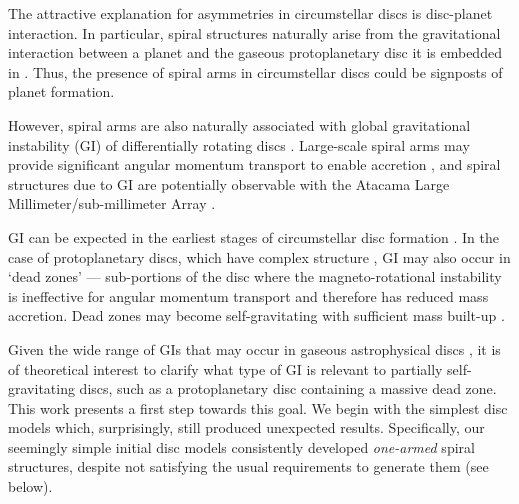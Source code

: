 \documentclass[useAMS,usenatbib]{mn2e}
\begin{document}
The attractive explanation for asymmetries in circumstellar discs is
disc-planet interaction. In particular, spiral structures  
naturally arise from the gravitational interaction between a
planet and the gaseous protoplanetary disc it is embedded in
\citep[see, e.g.][for a recent review]{baruteau13b}. Thus, the
presence of spiral arms in circumstellar discs could be signposts of 
planet formation.  

However, spiral arms are also naturally associated with global gravitational 
instability (GI) of differentially rotating discs
\citep{goldreich65,laughlin96b,laughlin98,nelson98,lodato05,forgan11}. Large-scale
spiral arms may provide significant angular momentum transport to enable
accretion \citep{lynden-bell72, papaloizou91,balbus99,lodato04}, and
spiral structures due to GI are potentially observable with the Atacama Large 
Millimeter/sub-millimeter Array \citep{cossins10,dipierror14}.   

GI can be expected in the earliest stages of 
circumstellar disc formation \citep{kratter10b,inutsuka10,tsukamoto13}. %
In the case of protoplanetary discs, which have complex structure
\citep{armitage10}, GI may also occur in `dead
zones' --- sub-portions of the disc where the magneto-rotational
instability is ineffective for angular momentum transport
\citep{gammie96,turner08,landry13} and therefore has reduced mass
accretion. Dead zones may become
self-gravitating with sufficient mass built-up
\citep{armitage01,martin12,martin12b,zhu09,zhu10,zhu10b,bae13,bae14}.   

Given the wide range of GIs that may occur in  gaseous 
astrophysical discs
\citep{papaloizou89,christo92,christo93,hadley11,hadley14}, it is of 
theoretical interest to clarify what type of GI is relevant to 
partially self-gravitating discs, such as a protoplanetary disc containing a 
massive dead zone.  %
This work presents a first step towards this goal. We begin with
the simplest disc models which, surprisingly, still produced
unexpected results. Specifically, our seemingly simple initial disc models
consistently developed \emph{one-armed} spiral structures, despite not 
satisfying the usual requirements to generate them 
(see below). 

\end{document}
